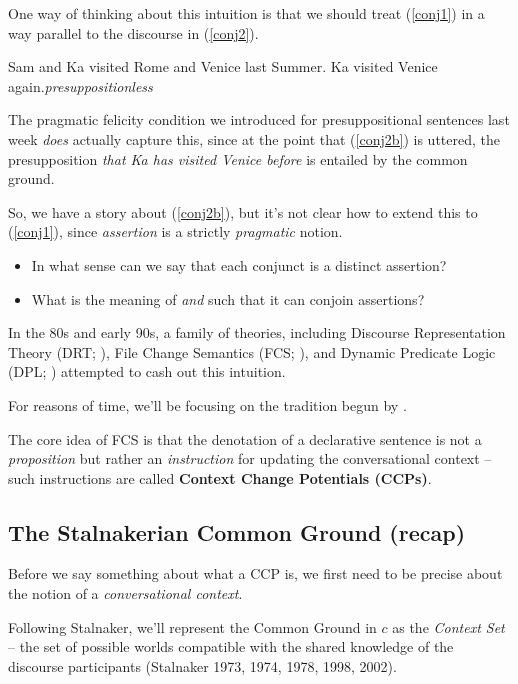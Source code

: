 \documentclass[cronos,landscape,paper=letter]{ling-handout}
\begin{document}
One way of thinking about this intuition is that we should treat (\ref{conj1}) in a way parallel to the discourse in (\ref{conj2}).

\pex\label{conj2}
\a\label{conj2a}Sam and Ka visited Rome and Venice last Summer.
\a\label{conj2b}Ka visited Venice again.\hfill\textit{presuppositionless}
\xe

The pragmatic felicity condition we introduced for presuppositional sentences last week \textit{does} actually capture this, since at the point that (\ref{conj2b}) is uttered, the presupposition \textit{that Ka has visited Venice before} is entailed by the common ground.

So, we have a story about (\ref{conj2b}), but it's not clear how to extend this to (\ref{conj1}), since \textit{assertion} is a strictly \textit{pragmatic} notion.

\begin{itemize}

  \item In what sense can we say that each conjunct is a distinct assertion?

  \item What is the meaning of \textit{and} such that it can conjoin assertions?

\end{itemize}

In the 80s and early 90s, a family of theories, including Discourse Representation Theory (DRT; \citealt{kamp1981}), File Change Semantics (FCS; \citealt[ch.\,3]{heim1982}), and Dynamic Predicate Logic (DPL; \citealt{groenendijk_dynamic_1991}) attempted to cash out this intuition.

For reasons of time, we'll be focusing on the tradition begun by \citeauthor{heim1982}.

The core idea of FCS is that the denotation of a declarative sentence is not a \textit{proposition} but rather an \textit{instruction} for updating the conversational context -- such instructions are called \textbf{Context Change Potentials (CCPs)}.

\subsection{The Stalnakerian Common Ground (recap)}

Before we say something about what a CCP is, we first need to be precise about the notion of a \textit{conversational context}.

Following Stalnaker, we'll represent the Common Ground in \(c\) as the \textit{Context Set} -- the set of possible worlds compatible with the shared knowledge of the discourse participants (Stalnaker 1973, 1974, 1978, 1998, 2002).
\end{document}
